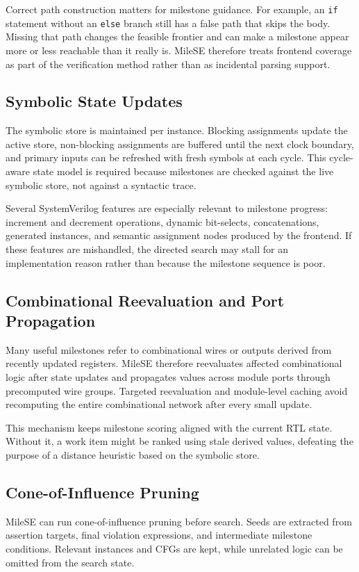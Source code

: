 \documentclass[conference]{IEEEtran}
\begin{document}
Correct path construction matters for milestone guidance. For example, an \texttt{if} statement without an \texttt{else} branch still has a false path that skips the body. Missing that path changes the feasible frontier and can make a milestone appear more or less reachable than it really is. MileSE therefore treats frontend coverage as part of the verification method rather than as incidental parsing support.

\subsection{Symbolic State Updates}
The symbolic store is maintained per instance. Blocking assignments update the active store, non-blocking assignments are buffered until the next clock boundary, and primary inputs can be refreshed with fresh symbols at each cycle. This cycle-aware state model is required because milestones are checked against the live symbolic store, not against a syntactic trace.

Several SystemVerilog features are especially relevant to milestone progress: increment and decrement operations, dynamic bit-selects, concatenations, generated instances, and semantic assignment nodes produced by the frontend. If these features are mishandled, the directed search may stall for an implementation reason rather than because the milestone sequence is poor.

\subsection{Combinational Reevaluation and Port Propagation}
Many useful milestones refer to combinational wires or outputs derived from recently updated registers. MileSE therefore reevaluates affected combinational logic after state updates and propagates values across module ports through precomputed wire groups. Targeted reevaluation and module-level caching avoid recomputing the entire combinational network after every small update.

This mechanism keeps milestone scoring aligned with the current RTL state. Without it, a work item might be ranked using stale derived values, defeating the purpose of a distance heuristic based on the symbolic store.

\subsection{Cone-of-Influence Pruning}
MileSE can run cone-of-influence pruning before search. Seeds are extracted from assertion targets, final violation expressions, and intermediate milestone conditions. Relevant instances and CFGs are kept, while unrelated logic can be omitted from the search state.
\end{document}

